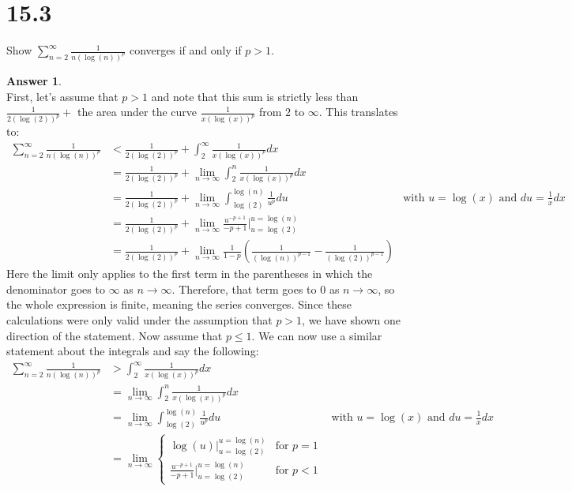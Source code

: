 \documentclass[10pt,a4paper]{article}
\theoremstyle{definition}
\newtheorem*{answer*}{Answer}
\begin{document}
\section*{15.3}
Show $\displaystyle \sum_{n = 2}^{\infty} \frac{1}{n(\log(n))^p}$ converges if and only if $p > 1$.

\begin{answer*}{$ $}
\\First, let's assume that $p > 1$ and note that this sum is strictly less than $\displaystyle \frac{1}{2(\log(2))^p} + $ the area under the curve $\displaystyle \frac{1}{x(\log(x))^p}$ from $2$ to $\infty$. This translates to:
\begin{align*}
\sum_{n = 2}^{\infty} \frac{1}{n(\log(n))^p} &< \frac{1}{2(\log(2))^p} + \int_2^{\infty} \frac{1}{x(\log(x))^p}dx\\
&= \frac{1}{2(\log(2))^p} + \lim_{n \to \infty} \int_2^n \frac{1}{x(\log(x))^p}dx\\
&= \frac{1}{2(\log(2))^p} + \lim_{n \to \infty} \int_{\log(2)}^{\log(n)} \frac{1}{u^p}du &\text{with $u = \log(x)$ and $du = \frac{1}{x}dx$}\\
&= \frac{1}{2(\log(2))^p} + \lim_{n \to \infty} \frac{u^{-p + 1}}{-p+1} \bigg|_{u = \log(2)}^{u = \log(n)}\\
&= \frac{1}{2(\log(2))^p} + \lim_{n \to \infty} \frac{1}{1 - p}\left(\frac{1}{(\log(n))^{p - 1}} - \frac{1}{(\log(2))^{p - 1}}\right)
\end{align*}
Here the limit only applies to the first term in the parentheses in which the denominator goes to $\infty$ as $n \to \infty$. Therefore, that term goes to $0$ as $n \to \infty$, so the whole expression is finite, meaning the series converges. Since these calculations were only valid under the assumption that $p > 1$, we have shown one direction of the statement. Now assume that $p \leq 1$. We can now use a similar statement about the integrals and say the following:
\begin{align*}
\sum_{n = 2}^{\infty} \frac{1}{n(\log(n))^p} &> \int_2^{\infty} \frac{1}{x(\log(x))^p}dx\\
&= \lim_{n \to \infty} \int_2^n \frac{1}{x(\log(x))^p}dx\\
&= \lim_{n \to \infty} \int_{\log(2)}^{\log(n)} \frac{1}{u^p}du &\text{with $u = \log(x)$ and $du = \frac{1}{x}dx$}\\
&= \lim_{n \to \infty} 
\begin{cases}
	\log(u) \bigg|_{u = \log(2)}^{u = \log(n)} &\text{for $p = 1$}\\
	\frac{u^{-p + 1}}{-p+1} \bigg|_{u = \log(2)}^{u = \log(n)} &\text{for $p < 1$}

\end{cases}
\end{align*}
\end{answer*}
\end{document}
